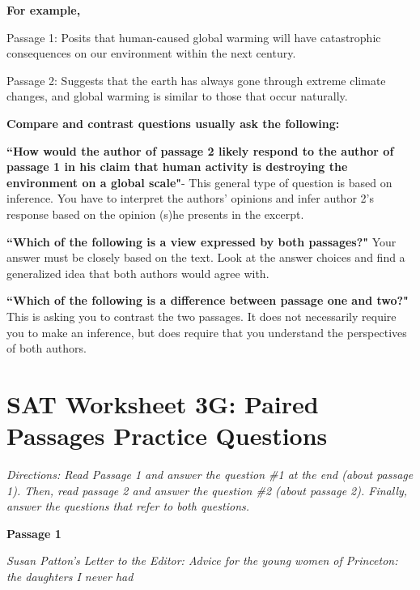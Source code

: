 \bigskip
\textbf{For example, }

Passage 1: Posits that human-caused global warming will have catastrophic consequences on our environment within the next century.

Passage 2: Suggests that the earth has always gone through extreme climate changes, and global warming is similar to those that occur naturally.

\newpage
\textbf{Compare and contrast questions usually ask the following:}

\bigskip
\indent \textbf{``How would the author of passage 2 likely respond to the author of passage 1 in his claim that human activity is destroying the environment on a global scale"}- This general type of question is based on inference.  You have to interpret the authors' opinions and infer author 2's response based on the opinion (s)he presents in the excerpt.
    
\bigskip
\indent \textbf{``Which of the following is a view expressed by both passages?"}   Your answer must be closely based on the text.  Look at the answer choices and find a generalized idea that both authors would agree with.

\bigskip
\indent \textbf{``Which of the following is a difference between passage one and two?"} This is asking you to contrast the two passages.  It does not necessarily require you to make an inference, but does require that you understand the perspectives of both authors.

\newpage
\section[Paired Passages]{SAT Worksheet 3G: Paired Passages Practice Questions}
\textit{Directions: Read Passage 1 and answer the question \#1 at the end (about passage 1). Then, read passage 2 and answer the question \#2 (about passage 2). Finally, answer the questions that refer to both questions. }

\bigskip
\textbf{Passage 1}

\textit{Susan Patton's Letter to the Editor: Advice for the young women of Princeton: the daughters I never had}

